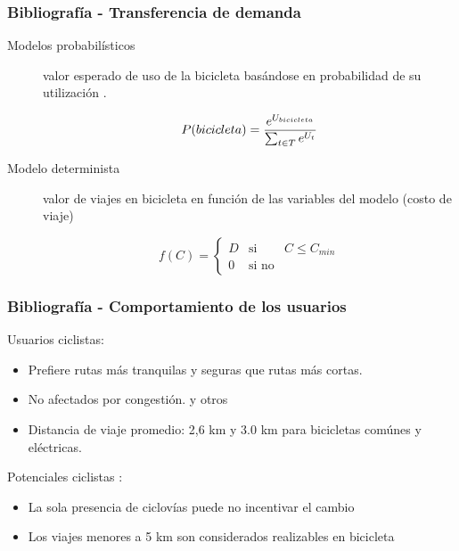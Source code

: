 \documentclass[aspectratio=43, 10pt]{beamer}
\begin{document}
\begin{frame}
    \frametitle{Bibliografía - Transferencia de demanda}


    \begin{description}
        \item[Modelos probabilísticos] {
            valor esperado de uso de la bicicleta basándose en probabilidad de su utilización
            \parencite{ortuz2011, Liu2019, Pacheco2021}.

            \begin{equation*}
                P(bicicleta) = {e^{U_{bicicleta}} \over \sum_{t \in T} e^{U_t}}
            \end{equation*}
        }
        \item[Modelo determinista] {
            valor de viajes en bicicleta en función de las variables del modelo (costo de viaje)
            \parencite{marin2007, laporte2007}

            \begin{equation*}
                f(C) = \left\{ \begin{array}{lcr}
                D & \text{si}   & C \leq C_{min} \\
                  0 & \text{si no} &
            \end{array}
            \right.
            \end{equation*}
        }
    \end{description}
\end{frame}


\begin{frame}
    \frametitle{Bibliografía - Comportamiento de los usuarios}

    Usuarios ciclistas:

    \begin{itemize}
        \item{Prefiere rutas más tranquilas y seguras que rutas más cortas. \parencite{winters2010}}
        \item{No afectados por congestión. \parencite{Lin2013, Duthie2014} y otros}
        \item{Distancia de viaje promedio: 2,6 km y 3.0 km para bicicletas comúnes y eléctricas. \parencite{anette2018}}
    \end{itemize}

    Potenciales ciclistas \parencite{shwe2014}:

    \begin{itemize}
        \item{La sola presencia de ciclovías puede no incentivar el cambio}
        \item{Los viajes menores a 5 km son considerados realizables en bicicleta}
    \end{itemize}
\end{frame}
\end{document}
